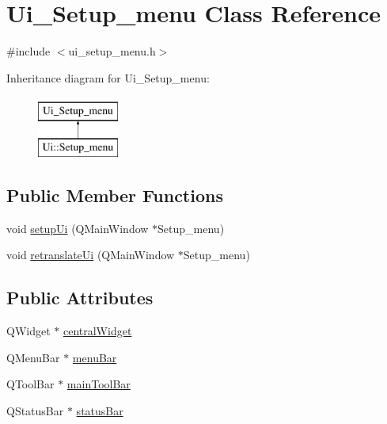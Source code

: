 \hypertarget{classUi__Setup__menu}{\section{Ui\-\_\-\-Setup\-\_\-menu Class Reference}
\label{classUi__Setup__menu}
}


{\ttfamily \#include $<$ui\-\_\-setup\-\_\-menu.\-h$>$}

Inheritance diagram for Ui\-\_\-\-Setup\-\_\-menu\-:\begin{figure}[H]
\begin{center}
\leavevmode
\includegraphics[height=2.000000cm]{classUi__Setup__menu}
\end{center}
\end{figure}
\subsection*{Public Member Functions}
\begin{DoxyCompactItemize}
\item 
void \hyperlink{classUi__Setup__menu_a955ec09b4541d88263c2a8be30a0d713}{setup\-Ui} (Q\-Main\-Window $\ast$Setup\-\_\-menu)
\item 
void \hyperlink{classUi__Setup__menu_a751af76f1c0f346abae17d3655bdde2b}{retranslate\-Ui} (Q\-Main\-Window $\ast$Setup\-\_\-menu)
\end{DoxyCompactItemize}
\subsection*{Public Attributes}
\begin{DoxyCompactItemize}
\item 
Q\-Widget $\ast$ \hyperlink{classUi__Setup__menu_a8ad7b9373da2ac90d9d7a70bacccb140}{central\-Widget}
\item 
Q\-Menu\-Bar $\ast$ \hyperlink{classUi__Setup__menu_a172549e1b5b0799af6b39eae5a58c6f7}{menu\-Bar}
\item 
Q\-Tool\-Bar $\ast$ \hyperlink{classUi__Setup__menu_a1b4525597f5e83a2eb1afd93ba044a06}{main\-Tool\-Bar}
\item 
Q\-Status\-Bar $\ast$ \hyperlink{classUi__Setup__menu_a4f657b28ad5893177d7f88f0675a0a4e}{status\-Bar}
\end{DoxyCompactItemize}


